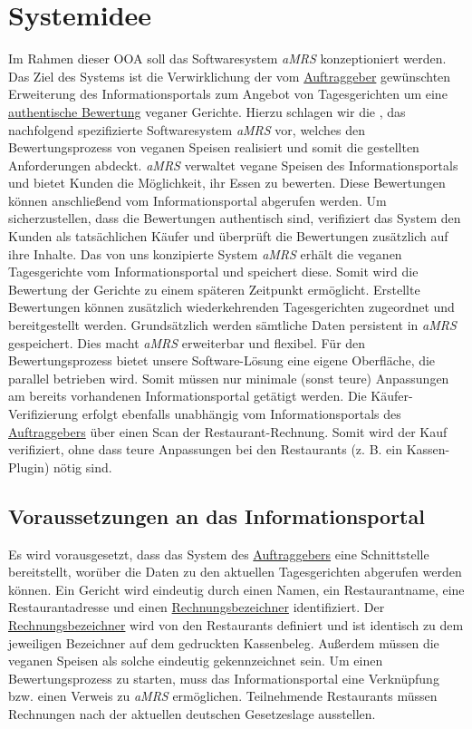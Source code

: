 \section{Systemidee}

Im Rahmen dieser \ac{OOA} soll das Softwaresystem \textit{\ac{aMRS}} konzeptioniert werden.
\newparagraph
Das Ziel des Systems ist die Verwirklichung der vom \hyperref[gls:auftraggeber]{Auftraggeber} gewünschten Erweiterung des Informationsportals zum Angebot von Tagesgerichten um eine \hyperref[gls:authentischeBewertung]{authentische Bewertung} veganer Gerichte.
Hierzu schlagen wir die \textit{\vFKW}, das nachfolgend spezifizierte Softwaresystem \textit{\ac{aMRS}} vor, welches den Bewertungsprozess von veganen Speisen realisiert und somit die gestellten Anforderungen abdeckt.
\textit{\ac{aMRS}} verwaltet vegane Speisen des Informationsportals und bietet Kunden die Möglichkeit, ihr Essen zu bewerten.
Diese Bewertungen können anschließend vom Informationsportal abgerufen werden.
Um sicherzustellen, dass die Bewertungen authentisch sind, verifiziert das System den Kunden als tatsächlichen Käufer und überprüft die Bewertungen zusätzlich auf ihre Inhalte.
\newparagraph
Das von uns konzipierte System \textit{\ac{aMRS}} erhält die veganen Tagesgerichte vom Informationsportal und speichert diese.
Somit wird die Bewertung der Gerichte zu einem späteren Zeitpunkt ermöglicht.
Erstellte Bewertungen können zusätzlich wiederkehrenden Tagesgerichten zugeordnet und bereitgestellt werden. Grundsätzlich werden sämtliche Daten persistent in \textit{\ac{aMRS}} gespeichert.
Dies macht \textit{\ac{aMRS}} erweiterbar und flexibel.
\newparagraph
Für den Bewertungsprozess bietet unsere Software-Lösung eine eigene Oberfläche, die parallel betrieben wird.
Somit müssen nur minimale (sonst teure) Anpassungen am bereits vorhandenen Informationsportal getätigt werden.
Die Käufer-Verifizierung erfolgt ebenfalls unabhängig vom Informationsportals des \hyperref[gls:auftraggeber]{Auftraggebers} über einen Scan der Restaurant-Rechnung.
Somit wird der Kauf verifiziert, ohne dass teure Anpassungen bei den Restaurants (z. B. ein Kassen-Plugin) nötig sind.

\subsection{Voraussetzungen an das Informationsportal}
Es wird vorausgesetzt, dass das System des \hyperref[gls:auftraggeber]{Auftraggebers} eine Schnittstelle bereitstellt, worüber die Daten zu den aktuellen Tagesgerichten abgerufen werden können.
Ein Gericht wird eindeutig durch einen Namen, ein Restaurantname, eine Restaurantadresse und einen \hyperref[gls:Rechnungsbezeichner]{Rechnungsbezeichner} identifiziert.
Der \hyperref[gls:Rechnungsbezeichner]{Rechnungsbezeichner} wird von den Restaurants definiert und ist identisch zu dem jeweiligen Bezeichner auf dem gedruckten Kassenbeleg.
Außerdem müssen die veganen Speisen als solche eindeutig gekennzeichnet sein.
\newparagraph
Um einen Bewertungsprozess zu starten, muss das Informationsportal eine Verknüpfung bzw. einen Verweis zu \textit{\ac{aMRS}} ermöglichen.
Teilnehmende Restaurants müssen Rechnungen nach der aktuellen deutschen Gesetzeslage ausstellen.

